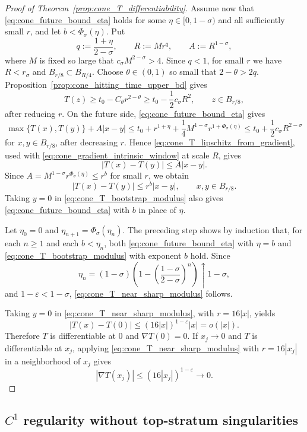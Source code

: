 \documentclass[11pt]{amsart}
\numberwithin{equation}{section}
\numberwithin{figure}{section}
\theoremstyle{plain}
\theoremstyle{definition}
\theoremstyle{remark}
\theoremstyle{plain}
\begin{document}
\begin{proof}[Proof of Theorem~\ref{prop:cone_T_differentiability}]
Assume now that \eqref{eq:cone_future_bound_eta} holds
for some \(\eta\in[0,1-\sigma)\) and all sufficiently small \(r\), and let
\(b<\Phi_\sigma(\eta)\). Put
\[
    q:=\frac{1+\eta}{2-\sigma},\qquad R:=Mr^q,\qquad A:=R^{1-\sigma},
\]
where $M$ is fixed so large that $c_\sigma M^{2-\sigma}>4$. Since $q<1$, for
small $r$ we have
$R<r_\sigma$ and $B_{r/8}\subset B_{R/4}$. Choose $\theta\in(0,1)$ so small
that $2-\theta>2q$. Proposition~\ref{prop:cone_hitting_time_upper_bd} gives
\[
    T(z)\geq t_0-C_\theta r^{2-\theta}\geq t_0-\frac12c_\sigma R^2,
    \qquad z\in B_{r/8},
\]
after reducing $r$. On the future side, \eqref{eq:cone_future_bound_eta} gives
\[
    \max\{T(x),T(y)\}+A|x-y|
    \leq t_0+r^{1+\eta}+\frac14M^{1-\sigma}r^{1+\Phi_\sigma(\eta)}
    \leq t_0+\frac12c_\sigma R^{2-\sigma}
\]
for $x,y\in B_{r/8}$, after decreasing $r$. Hence
\eqref{eq:cone_T_lipschitz_from_gradient}, used with
\eqref{eq:cone_gradient_intrinsic_window} at scale $R$, gives
\[
    |T(x)-T(y)|\leq A|x-y|.
\]
Since \(A=M^{1-\sigma}r^{\Phi_\sigma(\eta)}\leq r^b\) for small \(r\), we obtain
\begin{equation}\label{eq:cone_T_bootstrap_modulus}
    |T(x)-T(y)|\leq r^b|x-y|,
    \qquad x,y\in B_{r/8}.
\end{equation}
Taking $y=0$ in \eqref{eq:cone_T_bootstrap_modulus} also gives
\eqref{eq:cone_future_bound_eta} with \(b\) in place of \(\eta\).

Let \(\eta_0=0\) and
\(\eta_{n+1}=\Phi_\sigma(\eta_n)\). The preceding
step shows by induction that, for each \(n\geq1\) and each
\(b<\eta_n\), both
\eqref{eq:cone_future_bound_eta} with \(\eta=b\) and
\eqref{eq:cone_T_bootstrap_modulus} with exponent \(b\) hold. Since
\[
    \eta_n=(1-\sigma)\left(1-\left(\frac{1-\sigma}{2-\sigma}\right)^n\right)
    \uparrow 1-\sigma,
\]
and \(1-\varepsilon<1-\sigma\), \eqref{eq:cone_T_near_sharp_modulus} follows.

Taking $y=0$ in \eqref{eq:cone_T_near_sharp_modulus}, with $r=16|x|$, yields
\[
    |T(x)-T(0)|\leq (16|x|)^{1-\varepsilon}|x|=o(|x|).
\]
Therefore $T$ is differentiable at $0$ and $\nabla T(0)=0$. If $x_j\to0$ and
$T$ is differentiable at $x_j$, applying
\eqref{eq:cone_T_near_sharp_modulus} with $r=16|x_j|$ in a neighborhood of
$x_j$ gives
\[
    |\nabla T(x_j)|\leq (16|x_j|)^{1-\varepsilon}\to0.
\]
\end{proof}

\subsection{\texorpdfstring{$C^1$}{C1} regularity without top-stratum singularities}
\end{document}
